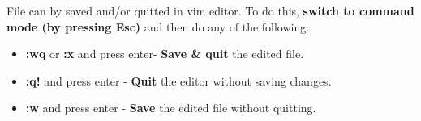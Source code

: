 
\begin{flushleft}
	
	
	\bigskip
	File can by saved and/or quitted in vim editor. 
	\newline
	To do this, \textbf{switch to command mode (by pressing Esc)} and then do any of the following:
	\begin{itemize}
		\item \textbf{:wq} or \textbf{:x} and press enter-  \textbf{Save \& quit} the edited file.
		\item \textbf{:q!} and press enter - \textbf{Quit} the editor without saving changes.
		\item \textbf{:w} and press enter - \textbf{Save} the edited file without quitting.
	\end{itemize}
		
\end{flushleft}
\newpage